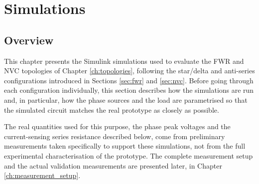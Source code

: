 \chapter{Simulations}
\label{ch:simulations}

\section{Overview}
\label{sec:sim_overview}

This chapter presents the Simulink simulations used to evaluate the FWR and NVC topologies of Chapter \ref{ch:topologies}, following the star/delta and anti-series configurations introduced in Sections \ref{sec:fwr} and \ref{sec:nvc}. Before going through each configuration individually, this section describes how the simulations are run and, in particular, how the phase sources and the load are parametrised so that the simulated circuit matches the real prototype as closely as possible.

The real quantities used for this purpose, the phase peak voltages and the current-sensing series resistance described below, come from preliminary measurements taken specifically to support these simulations, not from the full experimental characterisation of the prototype. The complete measurement setup and the actual validation measurements are presented later, in Chapter \ref{ch:measurement_setup}.

